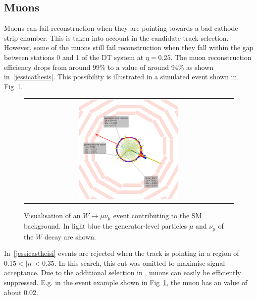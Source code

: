 \subsection*{Muons}
Muons can fail reconstruction when they are pointing towards a bad cathode strip chamber.
This is taken into account in the candidate track selection.
However, some of the muons still fail reconstruction when they fall within the gap between stations 0 and 1 of the DT system at $\eta=0.25$.
The muon reconstruction efficiency drops from around 99\% to a value of around 94\% as shown in~\ref{jessicathesis}. 
This possibility is illustrated in a simulated event shown in Fig~\ref{fig:LostMuon}.
\begin{figure}[!tb]
  \centering 
  \begin{tabular}{c}
    \includegraphics[width=0.49\textwidth]{figures/analysis/LostMuon_Lumi_357583_Event_142918834.png}
  \end{tabular}
  \caption{Visualisation of an $W\rightarrow \mu\nu_{\mu}$ event contributing to the SM background. 
           In light blue the generator-level particles $\mu$ and $\nu_{\mu}$ of the $W$ decay are shown. }
  \label{fig:LostMuon}
\end{figure}
In~\ref{jessicastheisi} events are rejected when the track is pointing in a region of $0.15<|\eta|<0.35$.
In this search, this cut was omitted to maximise signal acceptance. 
Due to the additional selection in \ias, muons can easily be efficiently suppressed.
E.g. in the event example shown in Fig~\ref{fig:LostMuon}, the muon has an \ias value of about 0.02.\\


